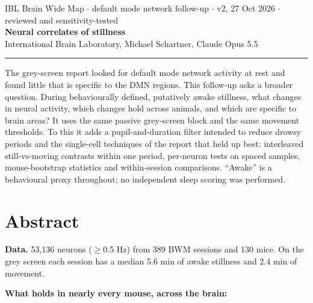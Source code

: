 \documentclass[10pt,a4paper]{article}
\begin{document}
{\small\color{muted} IBL Brain Wide Map $\cdot$ default mode network follow-up $\cdot$ v2, 27 Oct 2026 $\cdot$ reviewed and sensitivity-tested}\\[4pt]
{\LARGE\bfseries Neural correlates of stillness}\\[4pt]
{\normalsize International Brain Laboratory, Michael Schartner, Claude Opus 5.5}\\[2pt]
{\color{accent}\rule{\linewidth}{1.2pt}}

The grey-screen report looked for default mode network activity at rest and found little that is specific to the DMN regions. This follow-up asks a broader question. During behaviourally defined, putatively awake stillness, what changes in neural activity, which changes hold across animals, and which are specific to brain areas? It uses the same passive grey-screen block and the same movement thresholds. To this it adds a pupil-and-duration filter intended to reduce drowsy periods and the single-cell techniques of the report that held up best: interleaved still-vs-moving contrasts within one period, per-neuron tests on spaced samples, mouse-bootstrap statistics and within-session comparisons. ``Awake'' is a behavioural proxy throughout; no independent sleep scoring was performed.

\section{Abstract}
\textbf{Data.} 53,136 neurons ($\geq$0.5 Hz) from 389 BWM sessions and 130 mice. On the grey screen each session has a median 5.6 min of awake stillness and 2.4 min of movement.

\textbf{What holds in nearly every mouse, across the brain:}
\end{document}
